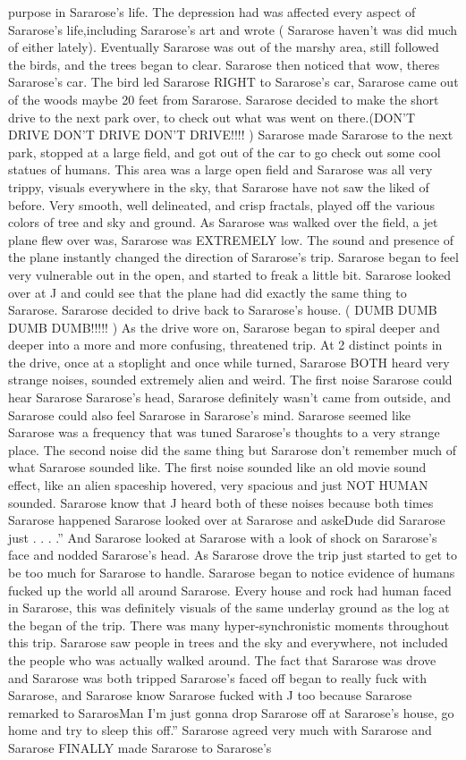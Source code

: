 \documentclass[12pt]{book}
\begin{document}
purpose in Sararose's life. The depression had was affected every aspect of Sararose's life,including Sararose's art and wrote ( Sararose haven't was did much of either lately). Eventually Sararose was out of the marshy area, still followed the birds, and the trees began to clear. Sararose then noticed that wow, theres Sararose's car. The bird led Sararose RIGHT to Sararose's car, Sararose came out of the woods maybe 20 feet from Sararose. Sararose decided to make the short drive to the next park over, to check out what was went on there.(DON'T DRIVE DON'T DRIVE DON'T DRIVE!!!! ) Sararose made Sararose to the next park, stopped at a large field, and got out of the car to go check out some cool statues of humans. This area was a large open field and Sararose was all very trippy, visuals everywhere in the sky, that Sararose have not saw the liked of before. Very smooth, well delineated, and crisp fractals, played off the various colors of tree and sky and ground. As Sararose was walked over the field, a jet plane flew over was, Sararose was EXTREMELY low. The sound and presence of the plane instantly changed the direction of Sararose's trip. Sararose began to feel very vulnerable out in the open, and started to freak a little bit. Sararose looked over at J and could see that the plane had did exactly the same thing to Sararose. Sararose decided to drive back to Sararose's house. ( DUMB DUMB DUMB DUMB!!!!! ) As the drive wore on, Sararose began to spiral deeper and deeper into a more and more confusing, threatened trip. At 2 distinct points in the drive, once at a stoplight and once while turned, Sararose BOTH heard very strange noises, sounded extremely alien and weird. The first noise Sararose could hear Sararose Sararose's head, Sararose definitely wasn't came from outside, and Sararose could also feel Sararose in Sararose's mind. Sararose seemed like Sararose was a frequency that was tuned Sararose's thoughts to a very strange place. The second noise did the same thing but Sararose don't remember much of what Sararose sounded like. The first noise sounded like an old movie sound effect, like an alien spaceship hovered, very spacious and just NOT HUMAN sounded. Sararose know that J heard both of these noises because both times Sararose happened Sararose looked over at Sararose and askeDude did Sararose just . . . .'' And Sararose looked at Sararose with a look of shock on Sararose's face and nodded Sararose's head. As Sararose drove the trip just started to get to be too much for Sararose to handle. Sararose began to notice evidence of humans fucked up the world all around Sararose. Every house and rock had human faced in Sararose, this was definitely visuals of the same underlay ground as the log at the began of the trip. There was many hyper-synchronistic moments throughout this trip. Sararose saw people in trees and the sky and everywhere, not included the people who was actually walked around. The fact that Sararose was drove and Sararose was both tripped Sararose's faced off began to really fuck with Sararose, and Sararose know Sararose fucked with J too because Sararose remarked to SararosMan I'm just gonna drop Sararose off at Sararose's house, go home and try to sleep this off.'' Sararose agreed very much with Sararose and Sararose FINALLY made Sararose to Sararose's 
\end{document}
